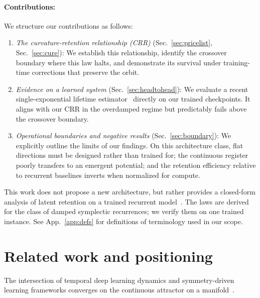 \documentclass[mlabstract,onecolumn]{jmlr}
\begin{document}
\paragraph{Contributions:} We structure our contributions as follows:
\begin{enumerate}
\item \emph{The curvature-retention relationship (CRR)} (Sec.~\ref{sec:pricelist}, Sec.~\ref{sec:cure}): We establish this relationship, identify the crossover boundary where this law halts, and demonstrate its survival under training-time corrections that preserve the orbit.
\item \emph{Evidence on a learned system} (Sec.~\ref{sec:headtohead}): We evaluate a recent single-exponential lifetime estimator~\citep{mo_symmetry-protected_2026} directly on our trained checkpoints. It aligns with our CRR in the overdamped regime but predictably fails above the crossover boundary.
\item \emph{Operational boundaries and negative results} (Sec.~\ref{sec:boundary}): We explicitly outline the limits of our findings. On this architecture class, flat directions must be designed rather than trained for; the continuous register poorly transfers to an emergent potential; and the retention efficiency relative to recurrent baselines inverts when normalized for compute.
\end{enumerate}

This work does not propose a new architecture, but rather provides a closed-form analysis of latent retention on a trained recurrent model~\citet{jawahar_chlu_2026}. The laws are derived for the class of damped symplectic recurrences; we verify them on one trained instance. See App.~\ref{app:defs} for definitions of terminology used in our scope.

\section{Related work and positioning}\label{sec:related}

The intersection of temporal deep learning dynamics and symmetry-driven learning frameworks converges on the continuous attractor on a manifold~\citep{golubitsky_singularities_1988,krupa_bifurcations_1990,rumberger_lyapunov_2001, sagodi_back_2025, seung_how_1996}.
\end{document}
